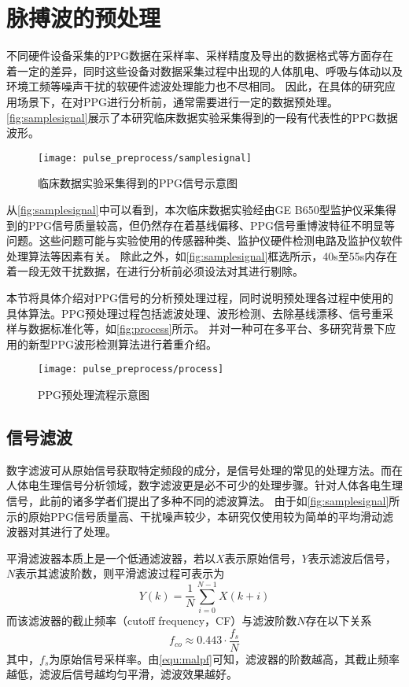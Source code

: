 \section{脉搏波的预处理}
不同硬件设备采集的PPG数据在采样率、采样精度及导出的数据格式等方面存在着一定的差异，同时这些设备对数据采集过程中出现的人体肌电、呼吸与体动以及环境工频等噪声干扰的软硬件滤波处理能力也不尽相同。
因此，在具体的研究应用场景下，在对PPG进行分析前，通常需要进行一定的数据预处理。
\autoref{fig:samplesignal}展示了本研究临床数据实验采集得到的一段有代表性的PPG数据波形。

\begin{figure}[htbp]
    \centering
    \texttt{[image: pulse\_preprocess/samplesignal]}
    \caption{\label{fig:samplesignal}临床数据实验采集得到的PPG信号示意图}
\end{figure}

从\autoref{fig:samplesignal}中可以看到，本次临床数据实验经由GE B650型监护仪采集得到的PPG信号质量较高，但仍然存在着基线偏移、PPG信号重博波特征不明显等问题。这些问题可能与实验使用的传感器种类、监护仪硬件检测电路及监护仪软件处理算法等因素有关。
除此之外，如\autoref{fig:samplesignal}框选所示，40s至55s内存在着一段无效干扰数据，在进行分析前必须设法对其进行剔除。

本节将具体介绍对PPG信号的分析预处理过程，同时说明预处理各过程中使用的具体算法。PPG预处理过程包括滤波处理、波形检测、去除基线漂移、信号重采样与数据标准化等，如\autoref{fig:process}所示。
并对一种可在多平台、多研究背景下应用的新型PPG波形检测算法进行着重介绍。
\begin{figure}[htbp]
    \centering
    \texttt{[image: pulse\_preprocess/process]}
    \caption{\label{fig:process}PPG预处理流程示意图}
\end{figure}

\subsection{信号滤波}
数字滤波可从原始信号获取特定频段的成分，是信号处理的常见的处理方法。而在人体电生理信号分析领域，数字滤波更是必不可少的处理步骤。针对人体各电生理信号，此前的诸多学者们提出了多种不同的滤波算法。
由于如\autoref{fig:samplesignal}所示的原始PPG信号质量高、干扰噪声较少，本研究仅使用较为简单的平均滑动滤波器对其进行了处理。

平滑滤波器本质上是一个低通滤波器，若以$X$表示原始信号，$Y$表示滤波后信号，$N$表示其滤波阶数，则平滑滤波过程可表示为
\begin{equation}
    \label{equ:filter}
    Y(k)=\frac{1}{N}\sum_{i=0}^{N-1}X(k+i)
\end{equation}
而该滤波器的截止频率（cutoff frequency，CF）与滤波阶数$N$存在以下关系\cite{malp2011,malp2022}
\begin{equation}
    \label{equ:malpf}
    f_{co} \approx 0.443 \cdot \frac{f_s}{N}    
\end{equation}
其中，$f_s$为原始信号采样率。由\autoref{equ:malpf}可知，滤波器的阶数越高，其截止频率越低，滤波后信号越均匀平滑，滤波效果越好。

